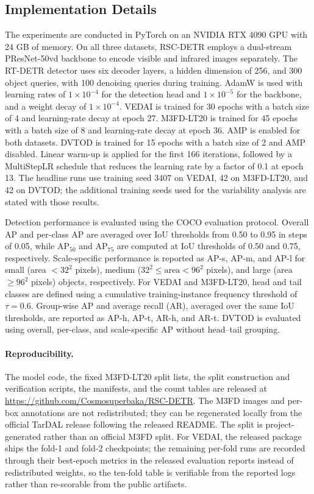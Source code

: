 \documentclass[letterpaper,journal]{IEEEtran}
\begin{document}
\subsection{Implementation Details}
The experiments are conducted in PyTorch on an NVIDIA
RTX 4090 GPU with 24 GB of memory. On all three datasets,
RSC-DETR employs a dual-stream PResNet-50vd backbone to
encode visible and infrared images separately. The RT-DETR
detector uses six decoder layers, a hidden dimension of
256, and 300 object queries, with 100 denoising queries
during training. AdamW is used with learning rates of
$1\times10^{-4}$ for the detection head and
$1\times10^{-5}$ for the backbone, and a weight decay
of $1\times10^{-4}$. VEDAI is trained for 30 epochs with
a batch size of 4 and learning-rate decay at epoch 27.
M3FD-LT20 is trained for 45 epochs with a batch size of 8
and learning-rate decay at epoch 36. AMP is enabled for
both datasets. DVTOD is trained for 15 epochs with a batch
size of 2 and AMP disabled. Linear warm-up is applied
for the first 166 iterations, followed by a MultiStepLR
schedule that reduces the learning rate by a factor of
0.1 at epoch 13. The headline runs use training seed 3407
on VEDAI, 42 on M3FD-LT20, and 42 on DVTOD; the additional
training seeds used for the variability analysis are stated
with those results.

Detection performance is evaluated using the COCO evaluation
protocol. Overall AP and per-class AP are averaged over IoU
thresholds from 0.50 to 0.95 in steps of 0.05, while AP$_{50}$
and AP$_{75}$ are computed at IoU thresholds of 0.50 and 0.75,
respectively. Scale-specific performance is reported as
AP-s, AP-m, and AP-l for small (area $<32^2$ pixels),
medium ($32^2 \leq \mathrm{area}<96^2$ pixels), and large
(area $\geq96^2$ pixels) objects, respectively.
For VEDAI and M3FD-LT20, head and tail classes are defined
using a cumulative training-instance frequency threshold
of $\tau=0.6$. Group-wise AP and average recall (AR),
averaged over the same IoU thresholds, are reported as
AP-h, AP-t, AR-h, and AR-t. DVTOD is evaluated using
overall, per-class, and scale-specific AP without
head--tail grouping.

\paragraph{Reproducibility.}
The model code, the fixed M3FD-LT20 split lists, the split
construction and verification scripts, the manifests, and the count tables
are released at \url{https://github.com/Cosmosuperbaka/RSC-DETR}. The M3FD
images and per-box annotations are not redistributed; they can be regenerated
locally from the official TarDAL release following the released README. The
split is project-generated rather than an official M3FD split. For VEDAI, the
released package ships the fold-1 and fold-2 checkpoints; the remaining per-fold
runs are recorded through their best-epoch metrics in the released evaluation
reports instead of redistributed weights, so the ten-fold table is verifiable
from the reported logs rather than re-scorable from the public artifacts.
\end{document}
